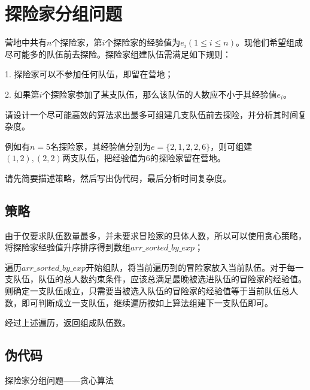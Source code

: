 \documentclass{article}
\begin{document}
\section{探险家分组问题}

营地中共有$n$个探险家，第$i$个探险家的经验值为$e_i(1 \le i \le n)$。现他们希望组成尽可能多的队伍前去探险。探险家组建队伍需满足如下规则：

1. 探险家可以不参加任何队伍，即留在营地；

2. 如果第$i$个探险家参加了某支队伍，那么该队伍的人数应不小于其经验值$e_i$。

请设计一个尽可能高效的算法求出最多可组建几支队伍前去探险，并分析其时间复杂度。

例如有$n=5$名探险家，其经验值分别为$e=\{2,1,2,2,6\}$，则可组建$(1,2),(2,2)$两支队伍，把经验值为$6$的探险家留在营地。

请先简要描述策略，然后写出伪代码，最后分析时间复杂度。

\subsection{策略}
由于仅要求队伍数量最多，并未要求冒险家的具体人数，所以可以使用贪心策略，将探险家经验值升序排序得到数组$arr\_sorted\_by\_exp$；

遍历$arr\_sorted\_by\_exp$开始组队，将当前遍历到的冒险家放入当前队伍。对于每一支队伍，队伍的总人数约束条件，应该总满足最晚被选进队伍的冒险家的经验值。则确定一支队伍成立，只需要当被选入队伍的冒险家的经验值等于当前队伍总人数，即可判断成立一支队伍，继续遍历按如上算法组建下一支队伍即可。

经过上述遍历，返回组成队伍数。

\subsection{伪代码}


\begin{algorithm}[H]
	\caption{探险家分组问题——贪心算法}
	\LinesNumbered

\end{algorithm}
\end{document}
